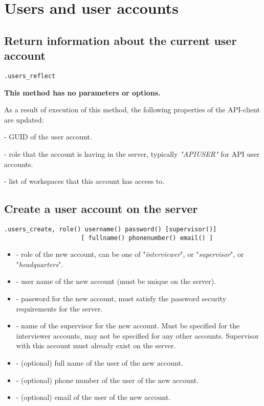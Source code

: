 \section{Users and user accounts}

\subsection{Return information about the current user account}
\begin{lstlisting}[style=CommandLineStyle]
.users_reflect
\end{lstlisting}

\textbf{This method has no parameters or options.}

\savedres

As a result of execution of this method, the following properties of the API-client are updated:

\begin{compactitem}
    \item {} - GUID of the user account.
    \item {} - role that the account is having in the server, typically \textit{"APIUSER"} for API user accounts.
    \item {} - list of workspaces that this account has access to.
\end{compactitem}


\subsection{Create a user account on the server}
\begin{lstlisting}[style=CommandLineStyle]
.users_create, role() username() password() [supervisor()]
                     [ fullname() phonenumber() email() ]
\end{lstlisting}

\optsheader
\begin{itemize}
      \item {} - role of the new account, can be one of "\textit{interviewer}", or "\textit{supervisor}", or "\textit{headquarters}".
      \item {} - user name of the new account (must be unique on the server).
      \item {} - password for the new account, must satisfy the password security requirements for the server.
      \item {} - name of the supervisor for the new account. Must be specified for the interviewer accounts, may not be specified for any other accounts. Supervisor with this account must already exist on the server.
     \item {} - (optional) full name of the user of the new account.
     \item {} - (optional) phone number of the user of the new account.
     \item {} - (optional) email of the user of the new account.
\end{itemize}


